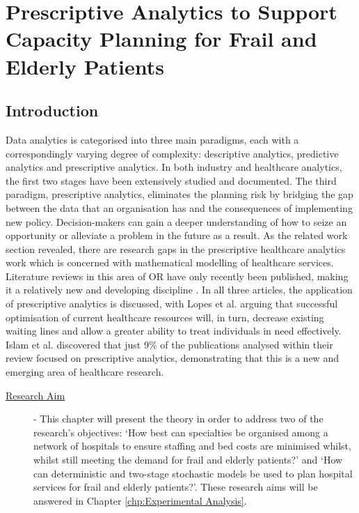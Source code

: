 \documentclass[../thesis.tex]{subfiles}
\begin{document}
\chapter{Prescriptive Analytics to Support Capacity Planning for Frail and Elderly Patients}\label{chp:presciptive}

\section{Introduction}

Data analytics is categorised into three main paradigms, each with a correspondingly varying degree of complexity: descriptive analytics, predictive analytics and prescriptive analytics. In both industry and healthcare analytics, the first two stages have been extensively studied and documented. The third paradigm, prescriptive analytics, eliminates the planning risk by bridging the gap between the data that an organisation has and the consequences of implementing new policy. Decision-makers can gain a deeper understanding of how to seize an opportunity or alleviate a problem in the future as a result. As the related work section revealed, there are research gaps in the prescriptive healthcare analytics work which is concerned with mathematical modelling of healthcare services. Literature reviews in this area of OR have only recently been published, making it a relatively new and developing discipline \cite{Islam2018,Lopes2020,Lepenioti2019}. In all three articles, the application of prescriptive analytics is discussed, with Lopes et al. \cite{Lopes2020} arguing that successful optimisation of current healthcare resources will, in turn, decrease existing waiting lines and allow a greater ability to treat individuals in need effectively. Islam et al. \cite{Islam2018} discovered that just 9\% of the publications analysed within their review focused on prescriptive analytics, demonstrating that this is a new and emerging area of healthcare research.


\begin{description}
\item[\underline{Research Aim}] - This chapter will present the theory in order to address two of the research's objectives: `How best can specialties be organised among a network of hospitals to ensure staffing and bed costs are minimised whilst, whilst still meeting the demand for frail and elderly patients?' and `How can deterministic and two-stage stochastic models be used to plan hospital services for frail and elderly patients?'. These research aims will be answered in Chapter \ref{chp:Experimental Analysis}.
\end{description}
\end{document}
